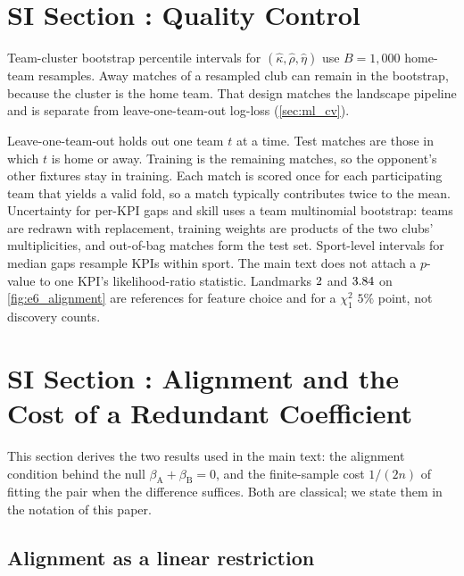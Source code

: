 \clearpage

\section*{SI Section \thesisection: Quality Control}
\label{sec:si_qc}

\noindent Team-cluster bootstrap percentile intervals for $(\hat\kappa,\hat\rho,\hat\eta)$ use $B=1{,}000$ home-team resamples.
Away matches of a resampled club can remain in the bootstrap, because the cluster is the home team.
That design matches the landscape pipeline and is separate from leave-one-team-out log-loss (\cref{sec:ml_cv}).

Leave-one-team-out holds out one team $t$ at a time.
Test matches are those in which $t$ is home or away.
Training is the remaining matches, so the opponent's other fixtures stay in training.
Each match is scored once for each participating team that yields a valid fold, so a match typically contributes twice to the mean.
Uncertainty for per-KPI gaps and skill uses a team multinomial bootstrap: teams are redrawn with replacement, training weights are products of the two clubs' multiplicities, and out-of-bag matches form the test set.
Sport-level intervals for median gaps resample KPIs within sport.
The main text does not attach a $p$-value to one KPI's likelihood-ratio statistic.
Landmarks $2$ and $3.84$ on \cref{fig:e6_alignment} are references for feature choice and for a $\chi^2_1$ $5\%$ point, not discovery counts.

\clearpage

\section*{SI Section \thesisection: Alignment and the Cost of a Redundant Coefficient}
\label{sec:si_alignment}

\noindent This section derives the two results used in the main text: the alignment condition behind the null $\beta_{\mathrm{A}}+\beta_{\mathrm{B}}=0$, and the finite-sample cost $1/(2n)$ of fitting the pair when the difference suffices.
Both are classical; we state them in the notation of this paper.

\subsection*{Alignment as a linear restriction}

